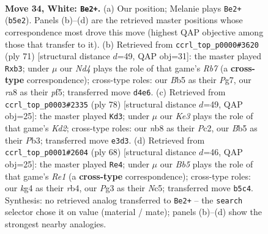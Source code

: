 \documentclass[11pt]{article}
\begin{document}
\clearpage

\begin{figure}[p]\centering
\begin{subfigure}{0.46\textwidth}\centering
\resizebox{\linewidth}{!}{%
\newchessgame
\chessboard[
  setfen={rn6/8/8/1B3p1p/3N2k1/pP2K1P1/r7/1R6 w - - 3 34},
  showmover=false,
  pgfstyle=straightmove, color=movearrow, markmove={b5-e2}
]}
\caption{}
\end{subfigure}\hfill
\begin{subfigure}{0.46\textwidth}\centering
\resizebox{\linewidth}{!}{%
\newchessgame
\chessboard[
  setfen={8/6pk/5p2/R4P1P/P7/1P5P/1r3pK1/8 b - - 0 36},
  showmover=false,
  pgfstyle=straightmove, color=movearrow, markmove={b2-b3}
]}
\caption{}
\end{subfigure}
\\[4pt]
\begin{subfigure}{0.46\textwidth}\centering
\resizebox{\linewidth}{!}{%
\newchessgame
\chessboard[
  setfen={8/5k2/4p1r1/1N4P1/3p1r2/PP6/2PKR3/8 w - - 3 40},
  showmover=false,
  pgfstyle=straightmove, color=movearrow, markmove={d2-d3}
]}
\caption{}
\end{subfigure}\hfill
\begin{subfigure}{0.46\textwidth}\centering
\resizebox{\linewidth}{!}{%
\newchessgame
\chessboard[
  setfen={2r4k/6p1/1n5p/R1N5/1r1p4/1P5P/5P2/4R1K1 w - - 0 35},
  showmover=false,
  pgfstyle=straightmove, color=movearrow, markmove={e1-e4}
]}
\caption{}
\end{subfigure}
\caption{\textbf{Move 34, White: \texttt{Be2+}.} (a) Our position; Melanie plays \texttt{Be2+} (\texttt{b5e2}). Panels (b)--(d) are the retrieved master positions whose correspondence most drove this move (highest QAP objective among those that transfer to it). (b) Retrieved from \texttt{ccrl\_top\_p0000\#3620} (ply 71) [structural distance $d$=49, QAP obj=31]: the master played \texttt{Rxb3}; under $\mu$ our \emph{Nd4} plays the role of that game's \emph{Rb7} (a \textbf{cross-type} correspondence); cross-type roles: our \emph{B}b5 as their \emph{P}g7, our \emph{r}a8 as their \emph{p}f5; transferred move \texttt{d4e6}. (c) Retrieved from \texttt{ccrl\_top\_p0003\#2335} (ply 78) [structural distance $d$=49, QAP obj=25]: the master played \texttt{Kd3}; under $\mu$ our \emph{Ke3} plays the role of that game's \emph{Kd2}; cross-type roles: our \emph{n}b8 as their \emph{P}c2, our \emph{B}b5 as their \emph{P}b3; transferred move \texttt{e3d3}. (d) Retrieved from \texttt{ccrl\_top\_p0001\#2604} (ply 68) [structural distance $d$=46, QAP obj=25]: the master played \texttt{Re4}; under $\mu$ our \emph{Bb5} plays the role of that game's \emph{Re1} (a \textbf{cross-type} correspondence); cross-type roles: our \emph{k}g4 as their \emph{r}b4, our \emph{P}g3 as their \emph{N}c5; transferred move \texttt{b5c4}. Synthesis: no retrieved analog transferred to \texttt{Be2+} -- the \texttt{search} selector chose it on value (material / mate); panels (b)--(d) show the strongest nearby analogies.}
\label{fig:thought-m66}
\end{figure}
\end{document}
